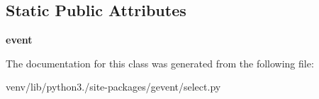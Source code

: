 \subsection*{Static Public Attributes}
\begin{DoxyCompactItemize}
\item 
\mbox{\label{classgevent_1_1select_1_1_select_result_ab7b91097321a018af62da56b8137a298}} 
{\bfseries event}
\end{DoxyCompactItemize}


The documentation for this class was generated from the following file\+:\begin{DoxyCompactItemize}
\item 
venv/lib/python3./site-\/packages/gevent/select.\+py\end{DoxyCompactItemize}

